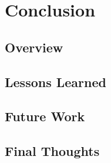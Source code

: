 \documentclass[12pt,letterpaper,oneside]{book}
\begin{document}
    \chapter{Conclusion}
    \label{conclusion}
        \section{Overview}
        \label{conclusionoverview}
        
    	
    	\section{Lessons Learned}
        \label{LessonsLearned}
        
        
        \section{Future Work}
        \label{FutureWork}
        
        
        \section{Final Thoughts}
        \label{finalthoughts}
        
        
    \appendix
     	
\backmatter
    
	\singlespace
	
    
    \clearpage
    
\end{document}

